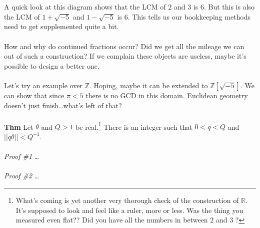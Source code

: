 \documentclass[12pt]{article}
\begin{document}
 \\ \\
A quick look at this diagram shows that the LCM of $2$ and $3$ is $6$.  But this is also the LCM of $1 + \sqrt{-5}$ and $1-\sqrt{-5}$ is $6$.  This tells us our bookkeeping methods need to get supplemented quite a bit. \\ \\
How and why do continued fractions occur?  Did we get all the mileage we can out of such a construction?  If we complain these objects are useless, maybe it's possible to design a better one.  \\ \\ 
Let's try an example over $\mathbb{Z}$.  Hoping, maybe it can be extended to $\mathbb{Z}[\sqrt{-5}]$.  We can show that since $\pi < 5 $ there is no GCD in this domain.  Euclidean geometry doesn't just finish\dots what's left of that?   \\ \\
\textbf{Thm} Let $\theta$ and $Q> 1$ be real.\footnote{What's coming is yet another very thorough check of the construction of $\mathbb{R}$.  It's supposed to look and feel like a ruler, more or less.  Was the thing you measured even flat?? Did you have all the numbers in between $2$ and $3$ ?} There is an integer such that $0 < q < Q$ and $||q \theta|| < Q^{-1}$. \\ \\
\textit{Proof \#1} \dots \\ \\ 
\textit{Proof \#2} \dots \\ 
\end{document}
